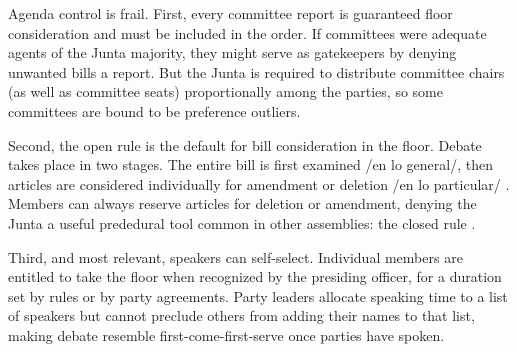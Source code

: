 \documentclass[letter,12pt]{article}
\begin{document}


Agenda control is frail. First, every committee report is guaranteed floor consideration and must be included in the order. If committees were adequate agents of the Junta majority, they might serve as gatekeepers by denying unwanted bills a report. But the Junta is required to distribute committee chairs (as well as committee seats) proportionally among the parties, so some committees are bound to be preference outliers.

Second, the open rule is the default for bill consideration in the floor. Debate takes place in two stages. The entire bill is first examined /en lo general/, then articles are considered individually for amendment or deletion /en lo particular/ \citep[see][]{heller.weldon.nd}. Members can always reserve articles for deletion or amendment, denying the Junta a useful prededural tool common in other assemblies: the closed rule \citep[eg.,][]{cox.2006,weingast.1992,magar-palanza-sin-Pdt-fast-track-chile-2021jop}.

Third, and most relevant, speakers can self-select. Individual members are entitled to take the floor when recognized by the presiding officer, for a duration set by rules or by party agreements. Party leaders allocate speaking time to a list of speakers but cannot preclude others from adding their names to that list, making debate resemble first-come-first-serve once parties have spoken. 

\end{document}
